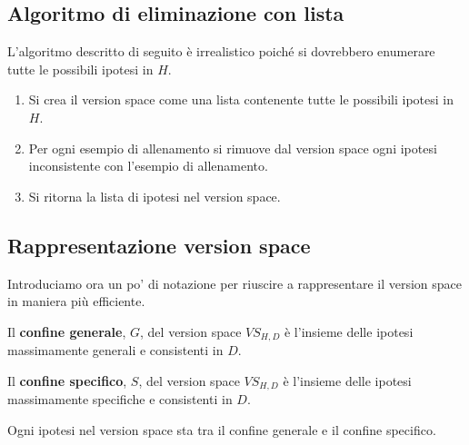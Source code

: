 \subsection{Algoritmo di eliminazione con lista}
L'algoritmo descritto di seguito \`e irrealistico poich\'e si dovrebbero enumerare tutte le possibili ipotesi in $H$.
\begin{enumerate}
	\item Si crea il version space come una lista contenente tutte le possibili ipotesi in $H$.
	\item Per ogni esempio di allenamento si rimuove dal version space ogni ipotesi inconsistente con l'esempio
	      di allenamento.
	\item Si ritorna la lista di ipotesi nel version space.
\end{enumerate}

\subsection{Rappresentazione version space}
Introduciamo ora un po' di notazione per riuscire a rappresentare il version space in maniera pi\`u efficiente.

\begin{definition}
	Il \textbf{confine generale}, $G$, del version space $VS_{H, D}$ \`e l'insieme delle ipotesi massimamente generali
	e consistenti in $D$.
\end{definition}

\begin{definition}
	Il \textbf{confine specifico}, $S$, del version space $VS_{H, D}$ \`e l'insieme delle ipotesi massimamente specifiche
	e consistenti in $D$.
\end{definition}

\begin{theorem}
	Ogni ipotesi nel version space sta tra il confine generale e il confine specifico.
\end{theorem}

